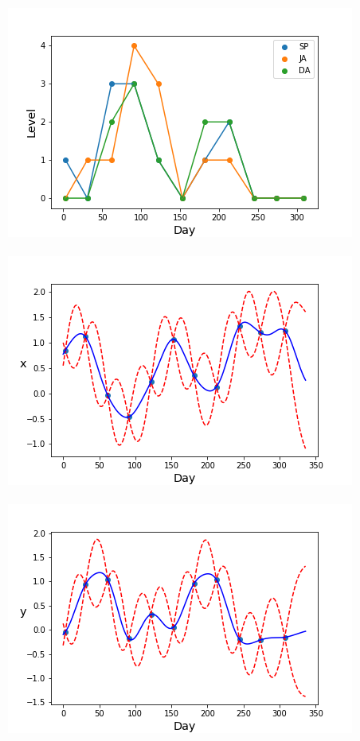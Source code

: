 \documentclass{article}
\begin{document}
\begin{figure}[ht!]
	\centering
	\begin{subfigure}[b]{0.24\textwidth}
		\includegraphics[width=\textwidth]{pic/2008year_cat}
	\end{subfigure}
	\begin{subfigure}[b]{0.24\textwidth}
		\includegraphics[width=\textwidth]{pic/year2008_D0}
	\end{subfigure}
	\begin{subfigure}[b]{0.24\textwidth}
		\includegraphics[width=\textwidth]{pic/year2008_D1}

\end{subfigure}
\end{figure}
\end{document}
